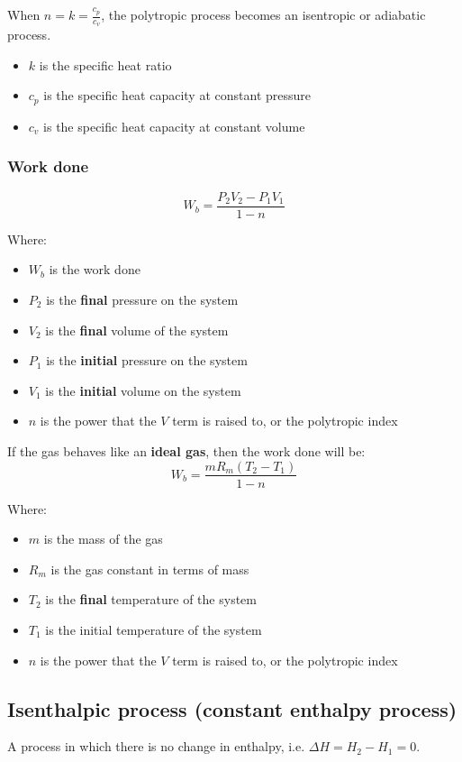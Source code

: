 \documentclass[11pt]{article}
\begin{document}
When \(n = k = \frac{c_p}{c_v}\), the polytropic process becomes an isentropic or adiabatic process.
\begin{itemize}
\item \(k\) is the specific heat ratio
\item \(c_p\) is the specific heat capacity at constant pressure
\item \(c_v\) is the specific heat capacity at constant volume
\end{itemize}

\newpage

\subsubsection{Work done}
\label{sec:org4a0b76d}
\[W_b = \frac{P_2 V_2 - P_1 V_1}{1 - n}\]

Where:
\begin{itemize}
\item \(W_b\) is the work done
\item \(P_2\) is the \textbf{final} pressure on the system
\item \(V_2\) is the \textbf{final} volume of the system
\item \(P_1\) is the \textbf{initial} pressure on the system
\item \(V_1\) is the \textbf{initial} volume on the system
\item \(n\) is the power that the \(V\) term is raised to, or the polytropic index
\end{itemize}

If the gas behaves like an \textbf{ideal gas}, then the work done will be:
\[W_b = \frac{m R_m (T_2 - T_1)}{1 - n}\]

Where:
\begin{itemize}
\item \(m\) is the mass of the gas
\item \(R_m\) is the gas constant in terms of mass
\item \(T_2\) is the \textbf{final} temperature of the system
\item \(T_1\) is the initial temperature of the system
\item \(n\) is the power that the \(V\) term is raised to, or the polytropic index
\end{itemize}

\subsection{Isenthalpic process (constant enthalpy process)}
\label{sec:org9ebc6d0}
A process in which there is no change in enthalpy, i.e. \(\Delta H = H_2 - H_1 = 0\).
\end{document}
